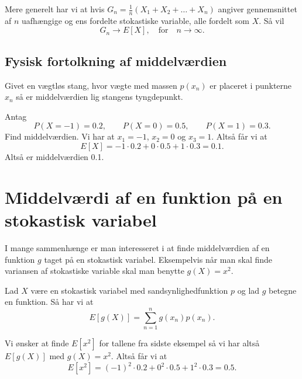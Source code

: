 \begin{sæt}
  Mere generelt har vi at hvis $G_n = \frac{1}{n}(X_1 + X_2 + \ldots + X_n)$ angiver gennemsnittet af $n$ uafhængige og ens fordelte stokastiske variable, alle fordelt som $X$. Så vil
  \[ 
    G_n \to E[X], \quad \text{for} \quad n \to \infty
  .\]
\end{sæt}

\subsection{Fysisk fortolkning af middelværdien}
Givet en vægtløs stang, hvor vægte med massen $p(x_n)$ er placeret i punkterne $x_n$ så er middelværdien lig stangens tyngdepunkt.

\begin{eks}
  Antag 
  \[ 
  P(X = -1) = \num{0,2}, \qquad P(X = 0) = \num{0,5}, \qquad P(X = 1) = \num{0,3} 
  .\]
  Find middelværdien.
  \bigbreak
  Vi har at $x_1 = -1$, $x_2 = 0$ og $x_3 = 1$. Altså får vi at
  \[ 
    E[X] = -1 \cdot \num{0,2} + 0 \cdot 0.5 + 1 \cdot \num{0,3}  = \num{0,1}  
  .\]
  Altså er middelværdien \num{0,1}. 
\end{eks}


\section{Middelværdi af en funktion på en stokastisk variabel}
I mange sammenhænge er man interesseret i at finde middelværdien af en funktion $g$ taget på en stokastisk variabel. Eksempelvis når man skal finde variansen af stokastiske variable skal man benytte $g(X) = x^2$.

\begin{sæt}
  Lad $X$ være en stokastisk variabel med sandsynlighedfunktion $p$ og lad $g$ betegne en funktion. Så har vi at
  \[ 
    E[g(X)] = \sum_{n = 1}^{n} g(x_n) p(x_n)
  .\]
\end{sæt}

\begin{eks}
  Vi ønsker at finde $E[x^2]$ for tallene fra sidste eksempel så vi har altså $E[g(X)]$ med $g(X) = x^2$. Altså får vi at
  \[ 
    E[x^2] = (-1)^2 \cdot \num{0,2} + 0^2 \cdot \num{0,5} + 1^2 \cdot \num{0,3} = \num{0,5}   
  .\]
\end{eks}

